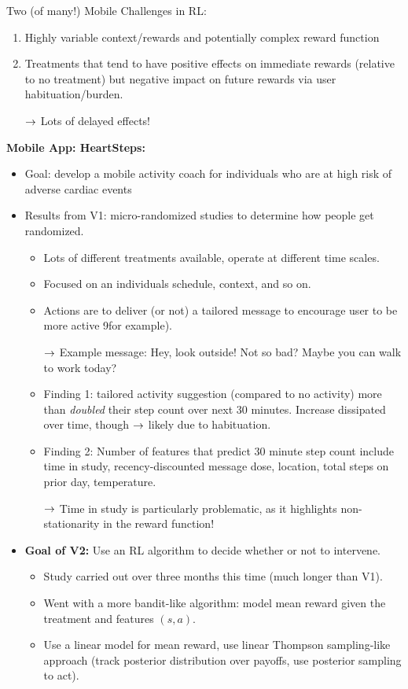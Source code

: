 Two (of many!) Mobile Challenges in RL:
\begin{enumerate}
    \item Highly variable context/rewards and potentially complex reward function
    \item Treatments that tend to have positive effects on immediate rewards (relative to no treatment) but negative impact on future rewards via user habituation/burden.
    
    $\rightarrow$ Lots of delayed effects!
\end{enumerate}

{\bf Mobile App: HeartSteps:}
\begin{itemize}
    \item Goal: develop a mobile activity coach for individuals who are at high risk of adverse cardiac events
    \item Results from V1: micro-randomized studies to determine how people get randomized.
    \begin{itemize}
        \item Lots of different treatments available, operate at different time scales.
        \item Focused on an individuals schedule, context, and so on.
        \item Actions are to deliver (or not) a tailored message to encourage user to be more active 9for example).
        
        $\rightarrow$ Example message: Hey, look outside! Not so bad? Maybe you can walk to work today?

        \item Finding 1: tailored activity suggestion (compared to no activity) more than {\it doubled} their step count over next 30 minutes. Increase dissipated over time, though $\rightarrow$ likely due to habituation. 
        \item Finding 2: Number of features that predict 30 minute step count include time in study, recency-discounted message dose, location, total steps on prior day, temperature.
        
        $\rightarrow$ Time in study is particularly problematic, as it highlights non-stationarity in the reward function!
    \end{itemize}
    
    \item {\bf Goal of V2:} Use an RL algorithm to decide whether or not to intervene.
    
    \begin{itemize}
        \item Study carried out over three months this time (much longer than V1).
        \item Went with a more bandit-like algorithm: model mean reward given the treatment and features $(s,a)$.
        \item Use a linear model for mean reward, use linear Thompson sampling-like approach (track posterior distribution over payoffs, use posterior sampling to act).
    \end{itemize}

\end{itemize}

